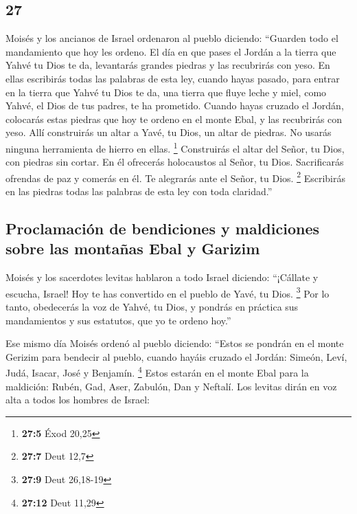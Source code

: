 \begin{paracol}{2}
\hypertarget{section-52}{%
\section{27}\label{section-52}}

 Moisés y los ancianos de Israel ordenaron al pueblo
diciendo: ``Guarden todo el mandamiento que hoy les ordeno.
 El día en que pases el Jordán a la tierra que Yahvé tu
Dios te da, levantarás grandes piedras y las recubrirás con yeso.
 En ellas escribirás todas las palabras de esta ley,
cuando hayas pasado, para entrar en la tierra que Yahvé tu Dios te da,
una tierra que fluye leche y miel, como Yahvé, el Dios de tus padres, te
ha prometido.  Cuando hayas cruzado el Jordán, colocarás
estas piedras que hoy te ordeno en el monte Ebal, y las recubrirás con
yeso.  Allí construirás un altar a Yavé, tu Dios, un altar
de piedras. No usarás ninguna herramienta de hierro en ellas.
\footnote{\textbf{27:5} Éxod 20,25}  Construirás el altar
del Señor, tu Dios, con piedras sin cortar. En él ofrecerás holocaustos
al Señor, tu Dios.  Sacrificarás ofrendas de paz y comerás
en él. Te alegrarás ante el Señor, tu Dios. \footnote{\textbf{27:7} Deut
  12,7}  Escribirás en las piedras todas las palabras de
esta ley con toda claridad.''

\hypertarget{proclamaciuxf3n-de-bendiciones-y-maldiciones-sobre-las-montauxf1as-ebal-y-garizim}{%
\subsection{Proclamación de bendiciones y maldiciones sobre las montañas
Ebal y
Garizim}\label{proclamaciuxf3n-de-bendiciones-y-maldiciones-sobre-las-montauxf1as-ebal-y-garizim}}

 Moisés y los sacerdotes levitas hablaron a todo Israel
diciendo: ``¡Cállate y escucha, Israel! Hoy te has convertido en el
pueblo de Yavé, tu Dios. \footnote{\textbf{27:9} Deut 26,18-19}
 Por lo tanto, obedecerás la voz de Yahvé, tu Dios, y
pondrás en práctica sus mandamientos y sus estatutos, que yo te ordeno
hoy.''

 Ese mismo día Moisés ordenó al pueblo diciendo:
 ``Estos se pondrán en el monte Gerizim para bendecir al
pueblo, cuando hayáis cruzado el Jordán: Simeón, Leví, Judá, Isacar,
José y Benjamín. \footnote{\textbf{27:12} Deut 11,29} 
Estos estarán en el monte Ebal para la maldición: Rubén, Gad, Aser,
Zabulón, Dan y Neftalí.  Los levitas dirán en voz alta a
todos los hombres de Israel:


\end{paracol}
